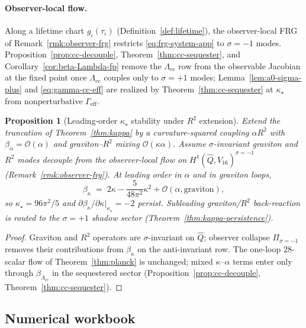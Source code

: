 \documentclass[11pt]{article}
\theoremstyle{plain}
\newtheorem{proposition}[theorem]{Proposition}
\theoremstyle{definition}
\theoremstyle{remark}
\numberwithin{equation}{section}
\begin{document}
\paragraph{Observer-local flow.}
Along a lifetime chart $g_\iota(\tau_\iota)$
(Definition~\ref{def:lifetime}), the observer-local FRG of
Remark~\ref{rmk:observer-frg} restricts \eqref{eq:frg-system-app} to
$\sigma=-1$ modes. Proposition~\ref{prop:cc-decouple},
Theorem~\ref{thm:cc-sequester}, and
Corollary~\ref{cor:beta-Lambda-fp} remove the $\Lambda_{\mathrm{cc}}$ row
from the observable Jacobian at the fixed point once $\Lambda_{\mathrm{cc}}$
couples only to $\sigma=+1$ modes; Lemma~\ref{lem:a0-sigma-plus} and
\eqref{eq:gamma-cc-eff} are realized by Theorem~\ref{thm:cc-sequester}
at $\kappa_\star$ from nonperturbative $\Gamma_{\mathrm{eff}}$.

\begin{proposition}[Leading-order $\kappa_\star$ stability under $R^2$ extension]
\label{prop:kappa-R2}
Extend the truncation of Theorem~\ref{thm:kappa} by a curvature-squared
coupling $\alpha R^2$ with $\beta_\alpha=\mathcal{O}(\alpha)$ and
graviton--$R^2$ mixing $\mathcal{O}(\kappa\alpha)$. Assume
$\sigma$-invariant graviton and $R^2$ modes decouple from the
observer-local flow on $H^1(\hat Q,V_{16})^{\sigma=-1}$
(Remark~\ref{rmk:observer-frg}). At leading order in $\alpha$ and in
graviton loops,
\begin{equation}\label{eq:betakappa-R2}
  \beta_\kappa
  \;=\;
  2\kappa-\frac{5}{48\pi^2}\kappa^2+\mathcal{O}(\alpha,\text{graviton}),
\end{equation}
so $\kappa_\star=96\pi^2/5$ and
$\partial\beta_\kappa/\partial\kappa|_{\kappa_\star}=-2$ persist.
Subleading graviton/$R^2$ back-reaction is routed to the
$\sigma=+1$ shadow sector (Theorem~\ref{thm:kappa-persistence}).
\end{proposition}

\begin{proof}
Graviton and $R^2$ operators are $\sigma$-invariant on $\hat Q$; observer
collapse $\Pi_{\sigma=-1}$ removes their contributions from
$\beta_\kappa$ on the anti-invariant row. The one-loop $28$-scalar flow of
Theorem~\ref{thm:planck} is unchanged; mixed $\kappa$--$\alpha$ terms enter
only through $\beta_{\Lambda_{\mathrm{cc}}}$ in the sequestered sector
(Proposition~\ref{prop:cc-decouple}, Theorem~\ref{thm:cc-sequester}).
\end{proof}

\subsection{Numerical workbook}
\label{sec:appendix:numerical}
\end{document}
